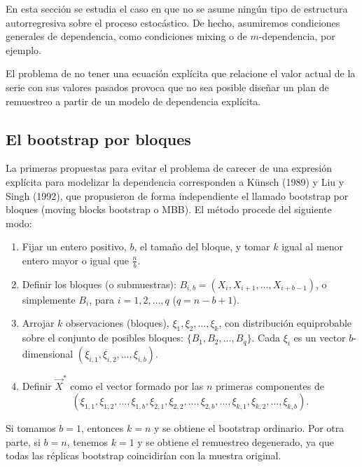 \documentclass[]{book}
\theoremstyle{definition}
\theoremstyle{definition}
\theoremstyle{definition}
\theoremstyle{remark}
\begin{document}
En esta sección se estudia el caso en que no se asume ningún tipo de
estructura autorregresiva sobre el proceso estocástico. De hecho,
asumiremos condiciones generales de dependencia, como condiciones mixing
o de \(m\)-dependencia, por ejemplo.

El problema de no tener una ecuación explícita que relacione el valor
actual de la serie con sus valores pasados provoca que no sea posible
diseñar un plan de remuestreo a partir de un modelo de dependencia
explícita.

\subsection{El bootstrap por bloques}\label{el-bootstrap-por-bloques}

La primeras propuestas para evitar el problema de carecer de una
expresión explícita para modelizar la dependencia corresponden a Künsch
(1989) y Liu y Singh (1992), que propusieron de forma independiente el
llamado bootstrap por bloques (moving blocks bootstrap o MBB). El método
procede del siguiente modo:

\begin{enumerate}
\def\labelenumi{\arabic{enumi}.}
\item
  Fijar un entero positivo, \(b\), el tamaño del bloque, y tomar \(k\)
  igual al menor entero mayor o igual que \(\frac{n}{b}\).
\item
  Definir los bloques (o submuestras):
  \(B_{i,b}=(X_i,X_{i+1},\ldots ,X_{i+b-1})\), o simplemente \(B_i\),
  para \(i=1,2,\ldots ,q\) (\(q=n-b+1\))\(.\)
\item
  Arrojar \(k\) observaciones (bloques),
  \(\xi _1,\xi _2,\ldots ,\xi _{k}\), con distribución equiprobable
  sobre el conjunto de posibles bloques: \(\{B_1,B_2,\ldots ,B_{q}\}\).
  Cada \(\xi _i\) es un vector \(b\)-dimensional
  \((\xi _{i,1},\xi _{i,2},\ldots ,\xi _{i,b})\).
\item
  Definir \(\vec{X}^{\ast}\) como el vector formado por las \(n\)
  primeras componentes de
  \[(\xi _{1,1},\xi _{1,2},\ldots ,\xi _{1,b},\xi _{2,1},\xi _{2,2},\ldots ,\xi
  _{2,b},\ldots ,\xi _{k,1},\xi _{k,2},\ldots ,\xi _{k,b}).\]
\end{enumerate}

Si tomamos \(b=1\), entonces \(k=n\) y se obtiene el bootstrap
ordinario. Por otra parte, si \(b=n\), tenemos \(k=1\) y se obtiene el
remuestreo degenerado, ya que todas las réplicas bootstrap coincidirían
con la muestra original.
\end{document}
